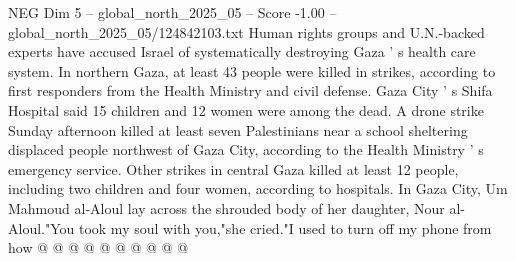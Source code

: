 \begin{textsample}{NEG Dim 5 – global\_north\_2025\_05 – Score -1.00 – global\_north\_2025\_05/124842103.txt}
Human rights groups and U.N.-backed experts have accused Israel of systematically destroying Gaza ' s health care system.
In northern Gaza, at least 43 people were killed in strikes, according to first responders from the Health Ministry and civil defense.
Gaza City ' s Shifa Hospital said 15 children and 12 women were among the dead.
A drone strike Sunday afternoon killed at least seven Palestinians near a school sheltering displaced people northwest of Gaza City, according to the Health Ministry ' s emergency service.
Other strikes in central Gaza killed at least 12 people, including two children and four women, according to hospitals.
In Gaza City, Um Mahmoud al-Aloul lay across the shrouded body of her daughter, Nour al-Aloul."You took my soul with you,"she cried."I used to turn off my phone from how @ @ @ @ @ @ @ @ @ @

\end{textsample}
